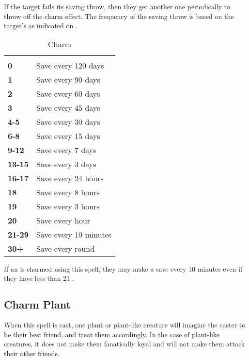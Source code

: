 \begin{multicols*}{2}
If the target fails its saving throw, then they get another one periodically to throw off the charm effect. The frequency of the saving throw is based on the target’s  as indicated on .

\begin {table}[H]
\caption{Charm}\label{tab:Charm}
  \begin{tabularx}{\columnwidth}{>{\bfseries}YY}
	 & \\
	0 & Save every 120 days\\
	1 & Save every 90 days\\
	2 & Save every 60 days\\
	3 & Save every 45 days\\
	4-5 & Save every 30 days\\
	6-8 & Save every 15 days\\
	9-12 & Save every 7 days\\
	13-15 & Save every 3 days\\
	16-17 & Save every 24 hours\\
	18 & Save every 8 hours\\
	19 & Save every 3 hours\\
	20 & Save every hour\\
	21-29 & Save every 10 minutes\\
	30+ & Save every round
  \end {tabularx}
\end {table}

If an  is charmed using this spell, they may make a save every 10 minutes even if they have less than 21 .

\subsection{Charm Plant}\label{spell:Charm Plant}

When this spell is cast, one plant or plant-like creature will imagine the caster to be their best friend, and treat them accordingly. In the case of plant-like creatures, it does not make them fanatically loyal and will not make them attack their other friends.


\end{multicols*}
